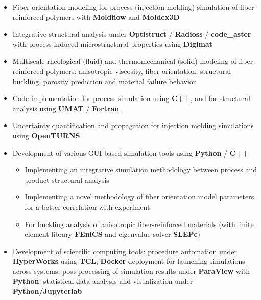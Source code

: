 \documentclass[10pt,a4paper]{altacv}
\begin{document}
\begin{itemize}
\item Fiber orientation modeling for process (injection molding) simulation of fiber-reinforced polymers with \textbf{Moldflow} and \textbf{Moldex3D}
\item Integrative structural analysis under \textbf{Optistruct} / \textbf{Radioss} / \textbf{code\_aster} with process-induced microstructural properties using \textbf{Digimat}
\item Multiscale rheological (fluid) and thermomechanical (solid) modeling of fiber-reinforced polymers: anisotropic viscosity, fiber orientation, structural buckling, porosity prediction and material failure behavior
\item Code implementation for process simulation using \textbf{C++}, and for structural analysis using \textbf{UMAT} / \textbf{Fortran}
\item Uncertainty quantification and propagation for injection molding simulations using \textbf{OpenTURNS}
\item Development of various GUI-based simulation tools using \textbf{Python} / \textbf{C++}
  \begin{itemize}
    \item Implementing an integrative simulation methodology between process and product structural analysis
    \item Implementing a novel methodology of fiber orientation model parameters for a better correlation with experiment
    \item For buckling analysis of anisotropic fiber-reinforced materials (with finite element library \textbf{FEniCS} and eigenvalue solver \textbf{SLEPc})
  \end{itemize}
\item Development of scientific computing tools: procedure automation under \textbf{HyperWorks} using \textbf{TCL}; \textbf{Docker} deployment for launching simulations across systems; post-processing of simulation results under \textbf{ParaView} with \textbf{Python}; statistical data analysis and visualization under \textbf{Python/Jupyterlab}
\end{itemize}

\divider
\end{document}
